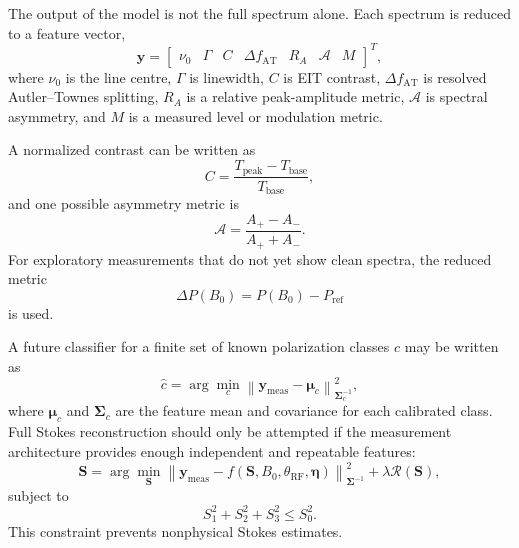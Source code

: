 \documentclass{ieeeaccess}
\begin{document}
The output of the model is not the full spectrum alone. Each spectrum is reduced to a feature vector,
\begin{equation}
\mathbf{y}
=
\begin{bmatrix}
\nu_0 &
\Gamma &
C &
\Delta f_{\mathrm{AT}} &
R_A &
\mathcal{A} &
M
\end{bmatrix}^{T},
\label{eq:annex_feature_vector}
\end{equation}
where \(\nu_0\) is the line centre, \(\Gamma\) is linewidth, \(C\) is EIT contrast, \(\Delta f_{\mathrm{AT}}\) is resolved Autler--Townes splitting, \(R_A\) is a relative peak-amplitude metric, \(\mathcal{A}\) is spectral asymmetry, and \(M\) is a measured level or modulation metric.

A normalized contrast can be written as
\begin{equation}
C
=
\frac{T_{\mathrm{peak}}-T_{\mathrm{base}}}{T_{\mathrm{base}}},
\label{eq:annex_contrast}
\end{equation}
and one possible asymmetry metric is
\begin{equation}
\mathcal{A}
=
\frac{A_{+}-A_{-}}{A_{+}+A_{-}}.
\label{eq:annex_asymmetry}
\end{equation}
For exploratory measurements that do not yet show clean spectra, the reduced metric
\begin{equation}
\Delta P(B_0)
=
P(B_0)-P_{\mathrm{ref}}
\label{eq:annex_deltaP}
\end{equation}
is used.

A future classifier for a finite set of known polarization classes \(c\) may be written as
\begin{equation}
\widehat{c}
=
\arg\min_c
\left\|
\mathbf{y}_{\mathrm{meas}}
-
\boldsymbol{\mu}_c
\right\|^2_{\mathbf{\Sigma}_c^{-1}},
\label{eq:annex_classifier}
\end{equation}
where \(\boldsymbol{\mu}_c\) and \(\mathbf{\Sigma}_c\) are the feature mean and covariance for each calibrated class. Full Stokes reconstruction should only be attempted if the measurement architecture provides enough independent and repeatable features:
\begin{equation}
\widehat{\mathbf{S}}
=
\arg\min_{\mathbf{S}}
\left\|
\mathbf{y}_{\mathrm{meas}}
-
f(\mathbf{S},B_0,\theta_{\mathrm{RF}},\boldsymbol{\eta})
\right\|_{\mathbf{\Sigma}^{-1}}^{2}
+
\lambda\mathcal{R}(\mathbf{S}),
\label{eq:annex_stokes_estimator}
\end{equation}
subject to
\begin{equation}
S_1^2+S_2^2+S_3^2
\leq
S_0^2.
\label{eq:annex_stokes_constraint}
\end{equation}
This constraint prevents nonphysical Stokes estimates.
\end{document}
